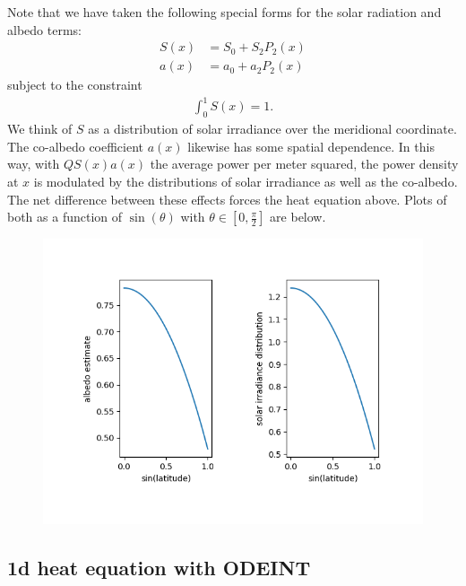\documentclass{article}
\theoremstyle{remark}
\begin{document}
Note that we have taken the following special forms for the solar radiation and albedo
terms:
\begin{align}
	S(x) & = S_0 + S_2 P_2(x)	\\
	a(x) & = a_0 + a_2 P_2(x)
\end{align}
subject to the constraint
\begin{align}
	\int_0^1 S(x) = 1.
\end{align}
We think of $S$ as a distribution of solar irradiance over the meridional coordinate. The
co-albedo coefficient $a(x)$ likewise has some spatial dependence. In this way,
with $QS(x)a(x)$ the average power per meter squared, the power density at $x$ is modulated 
by the distributions of solar irradiance as well as the co-albedo. 
The net difference between these effects forces the heat equation above.
Plots of both as a function of $\sin(\theta)$ with $\theta \in [0,\frac{\pi}{2}]$ are below.

\begin{figure}
\centering
\includegraphics{albedo_irradiance.png}
\end{figure}

\subsection{1d heat equation with ODEINT}
\end{document}
